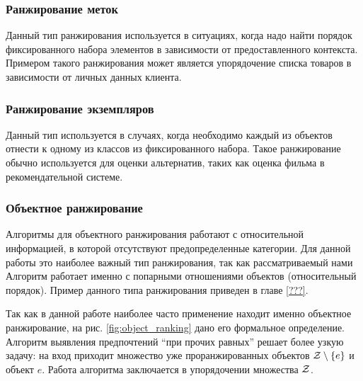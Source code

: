 	\subsubsection{Ранжирование меток}
		Данный тип ранжирования используется в ситуациях, когда надо найти порядок фиксированного набора элементов в зависимости от предоставленного контекста. Примером такого ранжирования может является упорядочение списка товаров в зависимости от личных данных клиента.
	
	\subsubsection{Ранжирование экземпляров}
		Данный тип используется в случаях, когда необходимо каждый из объектов отнести к одному из классов из фиксированного набора. Такое ранжирование обычно используется для оценки альтернатив, таких как оценка фильма в рекомендательной системе.
	
	\subsubsection{Объектное ранжирование}
		Алгоритмы для объектного ранжирования работают с 
		относительной %
		информацией, в которой отсутствуют предопределенные категории. Для данной работы это наиболее важный тип ранжирования, так как рассматриваемый нами Алгоритм работает именно с попарными отношениями объектов (относительный порядок). Пример данного типа ранжирования приведен в главе \ref{???}.
		
		Так как в данной работе наиболее часто применение находит именно объектное ранжирование, на рис. \ref{fig:object_ranking} дано его формальное определение. Алгоритм выявления предпочтений \enquote{при прочих равных} решает более узкую задачу: на вход приходит множество уже проранжированных объектов $\mathcal{Z} \setminus \{e\}$ и объект $e$. Работа алгоритма заключается в упорядочении множества $\mathcal{Z}$.
		
